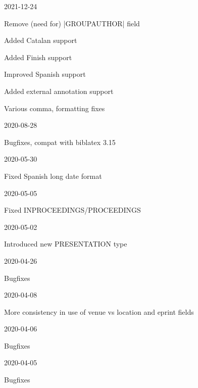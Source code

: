 \documentclass{ltxdockit}
\begin{document}
\begin{changelog}

\begin{release}{9.15}{2021-12-24}
\item Remove (need for) |GROUPAUTHOR| field
\item Added Catalan support
\item Added Finish support
\item Improved Spanish support
\item Added external annotation support
\item Various comma, formatting fixes
\end{release}

\begin{release}{9.14}{2020-08-28}
\item Bugfixes, compat with biblatex 3.15
\end{release}

\begin{release}{9.13}{2020-05-30}
\item Fixed Spanish long date format
\end{release}
  
\begin{release}{9.12}{2020-05-05}
\item Fixed INPROCEEDINGS/PROCEEDINGS
\end{release}

\begin{release}{9.11}{2020-05-02}
\item Introduced new PRESENTATION type
\end{release}

\begin{release}{9.10}{2020-04-26}
\item Bugfixes
\end{release}

\begin{release}{9.9}{2020-04-08}
\item More consistency in use of venue vs location and eprint fields
\end{release}

\begin{release}{9.8}{2020-04-06}
\item Bugfixes
\end{release}

\begin{release}{9.7}{2020-04-05}
\item Bugfixes
\end{release}


\end{changelog}
\end{document}
